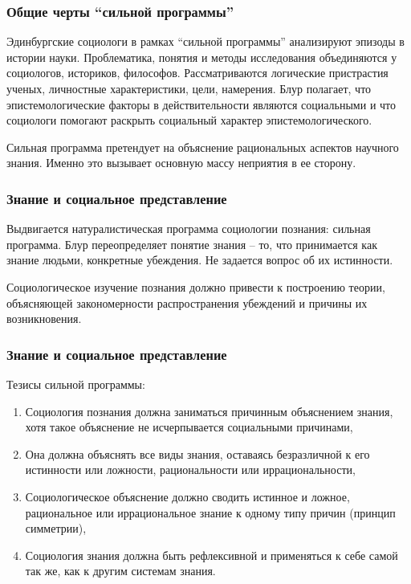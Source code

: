 \documentclass[10pt]{beamer}
\begin{document}
\begin{frame}[label=overview]%
  \frametitle{Общие черты ``сильной программы''}

  Эдинбургские социологи в рамках ``сильной программы'' анализируют 
  эпизоды в истории науки. Проблематика, понятия и методы исследования 
  объединяются у социологов, историков, философов. Рассматриваются 
  логические пристрастия ученых, личностные характеристики, цели, 
  намерения. Блур полагает, что эпистемологические факторы 
  в действительности являются социальными и что социологи помогают 
  раскрыть социальный характер эпистемологического.
  \vfill

  Сильная программа претендует на объяснение рациональных аспектов 
  научного знания. Именно это вызывает основную массу неприятия в ее 
  сторону.
\end{frame}%

\begin{frame}[label=book1-1]%
  \frametitle{Знание и социальное представление}

  Выдвигается натуралистическая программа социологии познания: сильная 
  программа. Блур переопределяет понятие знания -- то, что принимается 
  как знание людьми, конкретные убеждения. Не задается вопрос об их 
  истинности.
  \vfill

  Социологическое изучение познания должно привести к построению теории, 
  объясняющей закономерности распространения убеждений и причины их 
  возникновения.
\end{frame}%

\begin{frame}[label=book1-2]%
  \frametitle{Знание и социальное представление}

  Тезисы сильной программы:
  \begin{enumerate}
    \item Социология познания должна заниматься причинным объяснением 
      знания, хотя такое объяснение не исчерпывается социальными 
      причинами,
    \item Она должна объяснять все виды знания, оставаясь безразличной 
      к его истинности или ложности, рациональности или 
      иррациональности,
    \item Социологическое объяснение должно сводить истинное и ложное, 
      рациональное или иррациональное знание к одному типу причин 
      (принцип симметрии),
    \item Социология знания должна быть рефлексивной и применяться 
      к себе самой так же, как к другим системам знания.
  \end{enumerate}
\end{frame}%
\end{document}
